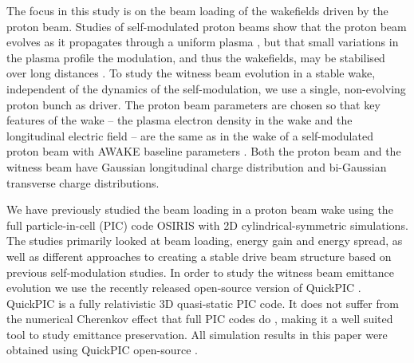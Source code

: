 \documentclass[aps,prstab,reprint,amsmath,amssymb,groupedaddress]{revtex4-1}
\begin{document}
The focus in this study is on the beam loading of the wakefields driven by the proton beam. Studies of self-modulated
proton beams show that the proton beam evolves as it propagates through a uniform plasma \cite{lotov:2011}, but that
small variations in the plasma profile the modulation, and thus the wakefields, may be stabilised over long distances
\cite{lotov:2011, lotov:2015, caldwell:2011}. To study the witness beam evolution in a stable wake, independent of the
dynamics of the self-modulation, we use a single, non-evolving proton bunch as driver. The proton beam parameters
are chosen so that key features of the wake -- the plasma electron density in the wake and the longitudinal electric
field -- are the same as in the wake of a self-modulated proton beam with AWAKE baseline parameters
\cite{gschwendtner:2016}. Both the proton beam and the witness beam have Gaussian longitudinal charge distribution and
bi-Gaussian transverse charge distributions.

We have previously studied the beam loading in a proton beam wake using the full particle-in-cell (PIC) code OSIRIS
\cite{fonseca:2002} with 2D cylindrical-symmetric simulations. The studies \cite{berglyd_olsen:2015, berglyd_olsen:2016}
primarily looked at beam loading, energy gain and energy spread, as well as different approaches to creating a stable
drive beam structure based on previous self-modulation studies. In order to study the witness beam emittance evolution
we use the recently released open-source version of QuickPIC \cite{huang:2006, an:2013}. QuickPIC is a fully
relativistic 3D quasi-static PIC code. It does not suffer from the numerical Cherenkov effect that full PIC codes do
\cite{godfrey:1974,lehe:2013}, making it a well suited tool to study emittance preservation. All simulation results in
this paper were obtained using QuickPIC open-source \cite{quickpic:web}.

\end{document}
